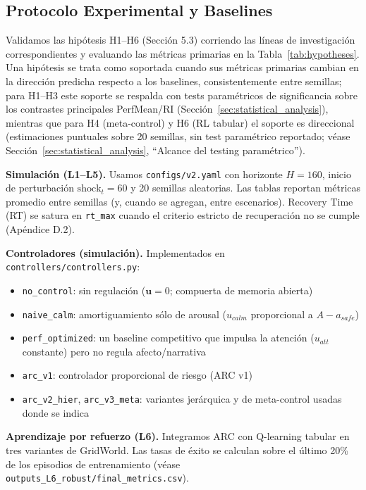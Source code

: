 \documentclass{article}
\begin{document}
\subsection{Protocolo Experimental y Baselines}

Validamos las hipótesis H1--H6 (Sección 5.3) corriendo las líneas de investigación correspondientes y evaluando las métricas primarias en la Tabla~\ref{tab:hypotheses}. Una hipótesis se trata como soportada cuando sus métricas primarias cambian en la dirección predicha respecto a los baselines, consistentemente entre semillas; para H1--H3 este soporte se respalda con tests paramétricos de significancia sobre los contrastes principales PerfMean/RI (Sección~\ref{sec:statistical_analysis}), mientras que para H4 (meta-control) y H6 (RL tabular) el soporte es direccional (estimaciones puntuales sobre 20 semillas, sin test paramétrico reportado; véase Sección~\ref{sec:statistical_analysis}, ``Alcance del testing paramétrico'').

\textbf{Simulación (L1--L5).} Usamos \texttt{configs/v2.yaml} con horizonte $H=160$, inicio de perturbación $\text{shock}_t=60$ y 20 semillas aleatorias. Las tablas reportan métricas promedio entre semillas (y, cuando se agregan, entre escenarios). Recovery Time (RT) se satura en \texttt{rt\_max} cuando el criterio estricto de recuperación no se cumple (Apéndice D.2).

\textbf{Controladores (simulación).} Implementados en \texttt{controllers/controllers.py}:
\begin{itemize}
    \item \texttt{no\_control}: sin regulación ($\mathbf{u}=0$; compuerta de memoria abierta)
    \item \texttt{naive\_calm}: amortiguamiento sólo de arousal ($u_{calm}$ proporcional a $A-a_{safe}$)
    \item \texttt{perf\_optimized}: un baseline competitivo que impulsa la atención ($u_{att}$ constante) pero no regula afecto/narrativa
    \item \texttt{arc\_v1}: controlador proporcional de riesgo (ARC v1)
    \item \texttt{arc\_v2\_hier}, \texttt{arc\_v3\_meta}: variantes jerárquica y de meta-control usadas donde se indica
\end{itemize}

\textbf{Aprendizaje por refuerzo (L6).} Integramos ARC con Q-learning tabular \cite{Watkins1992, Sutton2018} en tres variantes de GridWorld. Las tasas de éxito se calculan sobre el último 20\% de los episodios de entrenamiento (véase \texttt{outputs\_L6\_robust/final\_metrics.csv}).
\end{document}
